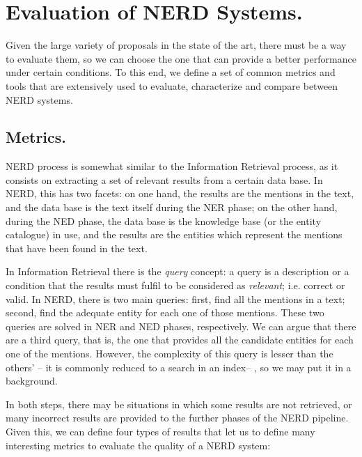 \section{Evaluation of NERD Systems.}
\label{sec:evaluation}

Given the large variety of proposals in the state of the art, there must be a way to evaluate them, so we can choose the one that can provide a better performance under certain conditions. To this end, we define a set of common metrics and tools that are extensively used to evaluate, characterize and compare between NERD systems.

\subsection{Metrics.}

NERD process is somewhat similar to the Information Retrieval process, as it consists on extracting a set of relevant results from a certain data base. In NERD, this has two facets: on one hand, the results are the mentions in the text, and the data base is the text itself during the NER phase; on the other hand, during the NED phase, the data base is the knowledge base (or the entity catalogue) in use, and the results are the entities which represent the mentions that have been found in the text.

In Information Retrieval there is the \emph{query} concept: a query is a description or a condition that the results must fulfil to be considered as \emph{relevant}; i.e. correct or valid. In NERD, there is two main queries: first, find all the mentions in a text; second, find the adequate entity for each one of those mentions. These two queries are solved in NER and NED phases, respectively. We can argue that there are a third query, that is, the one that provides all the candidate entities for each one of the mentions. However, the complexity of this query is lesser than the others' -- it is commonly reduced to a search in an index-- , so we may put it in a background. 

In both steps, there may be situations in which some results are not retrieved, or many incorrect results are provided to the further phases of the NERD pipeline. Given this, we can define four types of results that let us to define many interesting metrics to evaluate the quality of a NERD system:

